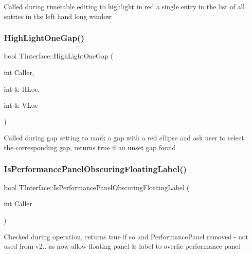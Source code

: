 Called during timetable editing to highlight in red a single entry in the list of all entries in the left hand long window \mbox{\label{class_t_interface_a44bce128da0e5ae552031e39552d0c39}} 
\subsubsection{\texorpdfstring{High\+Light\+One\+Gap()}{HighLightOneGap()}}
{\footnotesize\ttfamily bool T\+Interface\+::\+High\+Light\+One\+Gap (\begin{DoxyParamCaption}\item[{int}]{Caller,  }\item[{int \&}]{H\+Loc,  }\item[{int \&}]{V\+Loc }\end{DoxyParamCaption})\hspace{0.3cm}{\ttfamily [private]}}

Called during gap setting to mark a gap with a red ellipse and ask user to select the corresponding gap, returns true if an unset gap found \mbox{\label{class_t_interface_a6aabbfe2ebc6e92d6306697e2940b86c}} 
\subsubsection{\texorpdfstring{Is\+Performance\+Panel\+Obscuring\+Floating\+Label()}{IsPerformancePanelObscuringFloatingLabel()}}
{\footnotesize\ttfamily bool T\+Interface\+::\+Is\+Performance\+Panel\+Obscuring\+Floating\+Label (\begin{DoxyParamCaption}\item[{int}]{Caller }\end{DoxyParamCaption})\hspace{0.3cm}{\ttfamily [private]}}

Checked during operation, returns true if so and Performance\+Panel removed -\/ not used from v2.. as now allow floating panel \& label to overlie performance panel \mbox{\label{class_t_interface_a1cd9f01bcbcc37fb31712b7007d04dac}} 
